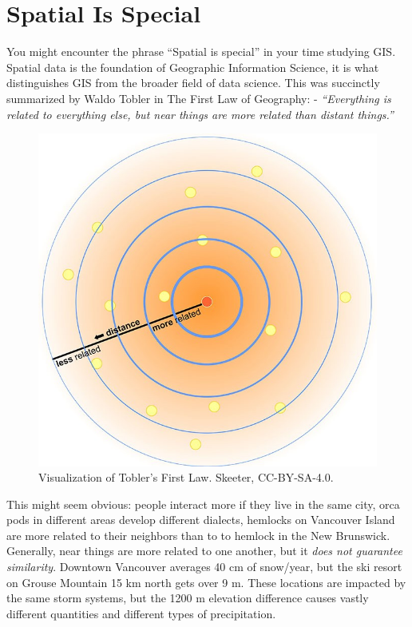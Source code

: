 \documentclass[
]{book}
\begin{document}
\hypertarget{spatial-is-special}{%
\section{Spatial Is Special}\label{spatial-is-special}}

You might encounter the phrase ``Spatial is special'' in your time studying GIS. Spatial data is the foundation of Geographic Information Science, it is what distinguishes GIS from the broader field of data science. This was succinctly summarized by Waldo Tobler in The First Law of Geography:
- \emph{``Everything is related to everything else, but near things are more related than distant things.''}

\begin{figure}
\includegraphics[width=0.75\linewidth]{images/03-spatial-is-special} \caption{Visualization of Tobler's First Law. Skeeter, CC-BY-SA-4.0.}\label{fig:3-spatial-is-special}
\end{figure}

This might seem obvious: people interact more if they live in the same city, orca pods in different areas develop different dialects, hemlocks on Vancouver Island are more related to their neighbors than to to hemlock in the New Brunswick. Generally, near things are more related to one another, but it \emph{does not guarantee similarity}. Downtown Vancouver averages 40 cm of snow/year, but the ski resort on Grouse Mountain 15 km north gets over 9 m. These locations are impacted by the same storm systems, but the 1200 m elevation difference causes vastly different quantities and different types of precipitation.
\end{document}
